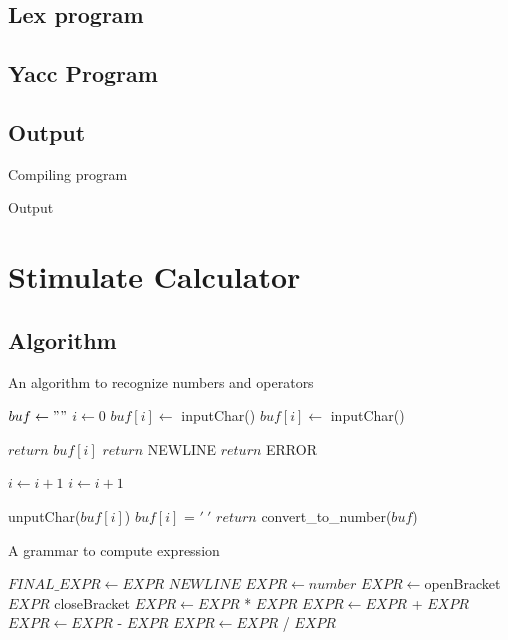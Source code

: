 \subsection{Lex program}

\subsection{Yacc Program}

\subsection{Output}
Compiling program



\vspace{0.5cm}
Output


\section{Stimulate Calculator}
\subsection{Algorithm}
\begin{algorithm}[H]
	\caption{An algorithm to recognize numbers and operators}
	\begin{algorithmic}[1]
		\State $buf \gets ""$
		\State $i \gets 0$
		\State $buf[i] \gets $ inputChar()
		\State $buf[i] \gets $ inputChar()
		\EndWhile
		
		\State $return$ $buf[i]$
		\State $return$ NEWLINE
		\State $return$ ERROR
		\EndIf
		
		\State $i \gets i+1$
		\State $i \gets i + 1$
		\EndWhile
		
		\State unputChar($buf[i]$) 
		\State $buf[i]$ = $'\ '$
		\State $return$ convert\_to\_number($buf$)		
	\end{algorithmic}
\end{algorithm}

\begin{algorithm}[H]
	\caption{A grammar to compute expression}
	\begin{algorithmic}[1]
		\State $FINAL\_EXPR \gets EXPR$ $NEWLINE$ 
		\State $EXPR \gets number$ 
		\State $EXPR \gets $openBracket $EXPR$ closeBracket 
		\State $EXPR \gets EXPR$ * $EXPR$ 
		\State $EXPR \gets EXPR$ + $EXPR$ 
		\State $EXPR \gets EXPR$ - $EXPR$ 
		\State $EXPR \gets EXPR$ / $EXPR$ 
		
	\end{algorithmic}
\end{algorithm}

